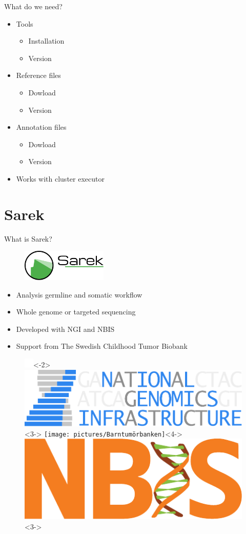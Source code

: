 \documentclass[usepdftitle=false]{beamer}
\begin{document}
\begin{frame}{What do we need?}
	\begin{itemize}
		\item Tools
		\pause
		\begin{itemize}
			\item Installation
			\item Version
		\end{itemize}
		\pause
		\item Reference files
		\pause
		\begin{itemize}
			\item Dowload
			\item Version
		\end{itemize}
		\pause
		\item Annotation files
		\pause
		\begin{itemize}
			\item Dowload
			\item Version
		\end{itemize}
		\pause
		\item Works with cluster executor
	\end{itemize}
\end{frame}

\section{Sarek}

\begin{frame}{What is Sarek?}
	\begin{figure}
		\includegraphics[height=1.5cm]{pictures/Sarek_no_border}
	\end{figure}
	\begin{itemize}
		\item Analysis germline and somatic workflow
		\item<2-> Whole genome or targeted sequencing
		\item<3-> Developed with NGI and NBIS
		\item<4-> Support from The Swedish Childhood Tumor Biobank
	\end{itemize}
	\begin{figure}
		\includegraphics[height=.8cm]{pictures/blank}<-2>
		\includegraphics[height=.8cm]{pictures/NGI}<3->
		\only<4->{\hfill}
		\texttt{[image: pictures/Barntumörbanken]}<4->
		\only<3->{\hfill}
		\includegraphics[height=.8cm]{pictures/NBIS-orange}<3->
	\end{figure}
	\vfill
\end{frame}
\end{document}
